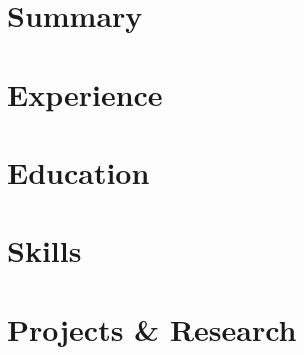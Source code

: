 





\section{Summary}

\sumRoboB
\vspace{-0.1em}

\section{Experience}

\saintsB %
\peraB
\rscs
\myride
\hiro
\launch
\bkgms


\vspace{-0.8em}
\section{Education}
\eduJob
\vspace{-0.6em}
\begin{cvcolumns}
\cvcolumn{}{\courseSum}
\cvcolumn{}{\honorsCol}
\end{cvcolumns}
\vspace{-0.6em}

\section{Skills}
\begin{cvcolumns}
\let\handle\skillColumn

  \skillsCode
  \skillsPlatRBE
  \skillsEmb
  \skillsRobotics
  \skillsLang


  

\end{cvcolumns}
\pagebreak %
\section{Projects \& Research}





